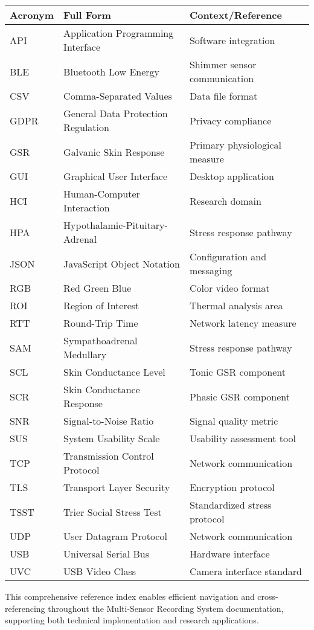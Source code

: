 \begin{longtable}{|l|l|l|}
\hline
\textbf{Acronym} & \textbf{Full Form} & \textbf{Context/Reference} \\
\hline
\endhead
API & Application Programming Interface & Software integration \\
BLE & Bluetooth Low Energy & Shimmer sensor communication \\
CSV & Comma-Separated Values & Data file format \\
GDPR & General Data Protection Regulation & Privacy compliance \\
GSR & Galvanic Skin Response & Primary physiological measure \\
GUI & Graphical User Interface & Desktop application \\
HCI & Human-Computer Interaction & Research domain \\
HPA & Hypothalamic-Pituitary-Adrenal & Stress response pathway \\
JSON & JavaScript Object Notation & Configuration and messaging \\
RGB & Red Green Blue & Color video format \\
ROI & Region of Interest & Thermal analysis area \\
RTT & Round-Trip Time & Network latency measure \\
SAM & Sympathoadrenal Medullary & Stress response pathway \\
SCL & Skin Conductance Level & Tonic GSR component \\
SCR & Skin Conductance Response & Phasic GSR component \\
SNR & Signal-to-Noise Ratio & Signal quality metric \\
SUS & System Usability Scale & Usability assessment tool \\
TCP & Transmission Control Protocol & Network communication \\
TLS & Transport Layer Security & Encryption protocol \\
TSST & Trier Social Stress Test & Standardized stress protocol \\
UDP & User Datagram Protocol & Network communication \\
USB & Universal Serial Bus & Hardware interface \\
UVC & USB Video Class & Camera interface standard \\
\hline
\end{longtable}

This comprehensive reference index enables efficient navigation and cross-referencing throughout the Multi-Sensor Recording System documentation, supporting both technical implementation and research applications.
